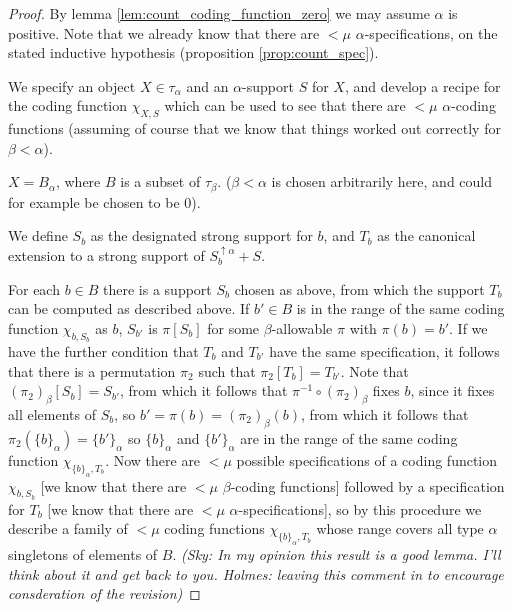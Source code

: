 \documentclass[112pt]{article}
\theoremstyle{definition}
\theoremstyle{remark}
\newcommand{\rk}[1]{{\color{blue}\sl #1}}
\begin{document}
\begin{proof}

{By lemma \ref{lem:count_coding_function_zero} we may assume $\alpha$ is positive.}
Note that we already know that there are $<\mu$ $\alpha$-specifications, on the stated inductive hypothesis {(proposition \ref{prop:count_spec})}.

We specify an object $X\in \tau_\alpha$ and an $\alpha$-support $S$ for $X$, and develop a recipe for the coding function $\chi_{X,S}$ which can be used to see that there are $<\mu$ $\alpha$-coding functions (assuming of course that we know that things worked out correctly for $\beta<\alpha$).


$X = B_\alpha$, where $B$ is a subset of $\tau_\beta$.  ($\beta<\alpha$ is chosen arbitrarily here{, and could for example be chosen to be 0}).

We define $S_b$ as the designated strong support for $b$, and $T_b$ as the canonical extension to a strong support of $S_b^{\uparrow \alpha}+S$. %



For each $b \in B$ there is a support $S_b$ chosen as above, from which the support $T_b$ can be computed as described above.  If $b' \in B$ is in the range of the same coding function $\chi_{b,S_b}$ as $b$, $S_{b'}$ is $\pi[S_{b}]$ for some $\beta$-allowable $\pi$ with $\pi(b) = b'$.
If we have the further condition that $T_b$ and $T_{b'}$ have the same specification, it follows that there is a permutation $\pi_2$ such that $\pi_2[T_b] = T_{b'}$.  Note that $(\pi_2)_\beta[S_b]=S_{b'}$, from which it follows that $\pi^{-1} \circ (\pi_2)_\beta$ fixes $b$, since it fixes all elements of $S_b$, so $b'=\pi(b) = (\pi_2)_\beta(b)$, from which it follows
that $\pi_2(\{b\}_\alpha) = \{b'\}_\alpha$ so $\{b\}_\alpha$ and $\{b'\}_\alpha$ are in the range of the same coding function $\chi_{\{b\}_\alpha,T_b}$.  Now there are $<\mu$ possible specifications of a coding function $\chi_{b,S_b}$ [we know that there are $<\mu$ $\beta$-coding functions]  followed by a specification for $T_b$ [we know that there are $<\mu$ $\alpha$-specifications], so by this procedure we describe a family of $<\mu$ coding functions $\chi_{\{b\}_\alpha,T_b}$ whose range covers all type $\alpha$ singletons of elements of $B$. \rk{(Sky: In my opinion this result is a good lemma. I'll think about it and get back to you.  Holmes: leaving this comment in to encourage consderation of the revision)}



\end{proof}
\end{document}

